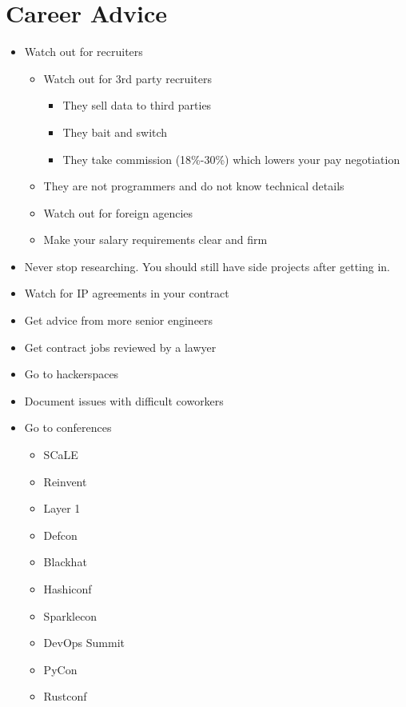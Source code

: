 \documentclass[12pt]{article}
\begin{document}
\section{Career Advice}
\begin{itemize}
\item Watch out for recruiters
  \begin{itemize}
  \item Watch out for 3rd party recruiters
    \begin{itemize}
    \item They sell data to third parties
    \item They bait and switch
    \item They take commission (18\%-30\%) which lowers your pay negotiation
    \end{itemize}
  \item They are not programmers and do not know technical details
  \item Watch out for foreign agencies
  \item Make your salary requirements clear and firm
  \end{itemize}
\item Never stop researching. You should still have side projects after getting in.
\item Watch for IP agreements in your contract
\item Get advice from more senior engineers
\item Get contract jobs reviewed by a lawyer
\item Go to hackerspaces
\item Document issues with difficult coworkers
\item Go to conferences
  \begin{itemize}
  \item SCaLE
  \item Reinvent
  \item Layer 1
  \item Defcon
  \item Blackhat
  \item Hashiconf
  \item Sparklecon
  \item DevOps Summit
  \item PyCon
  \item Rustconf
  \end{itemize}
\end{itemize}
\end{document}
